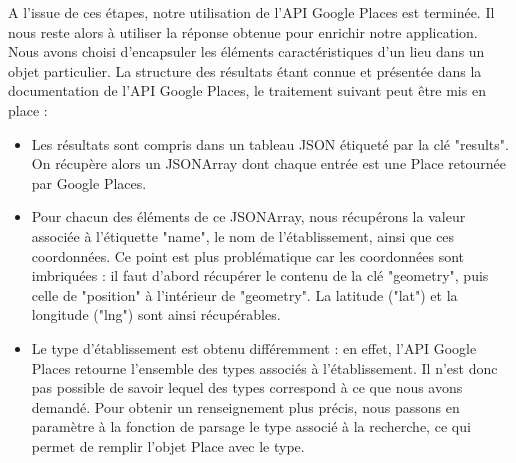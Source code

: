 A l'issue de ces étapes, notre utilisation de l'API Google Places est terminée. Il nous reste alors à utiliser la réponse obtenue pour enrichir notre application. Nous avons choisi d'encapsuler les éléments caractéristiques d'un lieu dans un objet particulier. La structure des résultats étant connue et présentée dans la documentation de l'API Google Places, le traitement suivant peut être mis en place :
\begin{itemize}
\item Les résultats sont compris dans un tableau JSON étiqueté par la clé "results". On récupère alors un JSONArray dont chaque entrée est une Place retournée par Google Places.
\item Pour chacun des éléments de ce JSONArray, nous récupérons la valeur associée à l'étiquette "name", le nom de l'établissement, ainsi que ces coordonnées. Ce point est plus problématique car les coordonnées sont imbriquées : il faut d'abord récupérer le contenu de la clé "geometry", puis celle de "position" à l'intérieur de "geometry". La latitude ("lat") et la longitude ("lng") sont ainsi récupérables.
\item Le type d'établissement est obtenu différemment : en effet, l'API Google Places retourne l'ensemble des types associés à l'établissement. Il n'est donc pas possible de savoir lequel des types correspond à ce que nous avons demandé. Pour obtenir un renseignement plus précis, nous passons en paramètre à la fonction de parsage le type associé à la recherche, ce qui permet de remplir l'objet Place avec le type.
\end{itemize}